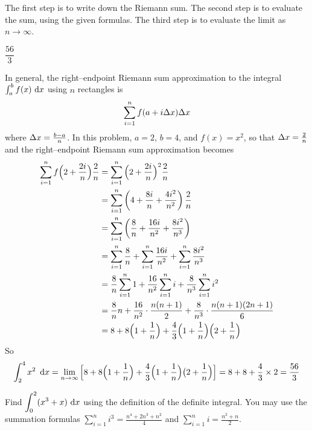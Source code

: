 \begin{hint}
The first step is to write down the Riemann sum.
The second step is to evaluate the sum, using the given formulas.
The third step is to evaluate the limit as $n\rightarrow\infty$.
\end{hint}

\begin{answer}
$\dfrac{56}{3}$
\end{answer}

\begin{solution}
In general, the right--endpoint Riemann sum
approximation to the integral $\int_a^b f(x)\,\,\mathrm{d}x$ using $n$ rectangles is
\begin{align*}
\sum_{i=1}^n f(a+i\Delta x) \Delta x
\end{align*}
where $\Delta x=\frac{b-a}{n}$. In this problem, $a=2$, $b=4$, and $f(x)=x^2$,
so that $\Delta x=\frac{2}{n}$ and the  right--endpoint Riemann
sum approximation becomes
\begin{align*}
\sum_{i=1}^n f\Big(2+\frac{2i}{n}\Big) \frac{2}{n}&=
\sum_{i=1}^n \Big(2+\frac{2i}{n}\Big)^2 \frac{2}{n}\\
&=\sum_{i=1}^n \left(4+\frac{8i}{n}+\frac{4i^2}{n^2}\right)\frac{2}{n}
\\&=\sum_{i=1}^n \left(\frac{8}{n}+\frac{16i}{n^2}+\frac{8i^2}{n^3}\right)
\\&=\sum_{i=1}^n \frac{8}{n}+\sum_{i=1}^n \frac{16i}{n^2}
  +\sum_{i=1}^n \frac{8i^2}{n^3} \cr
&=\frac{8}{n}\sum_{i=1}^n 1+\frac{16}{n^2}\sum_{i=1}^n i
  +\frac{8}{n^3}\sum_{i=1}^n i^2\cr
&=\frac{8}{n}n + \frac{16}{n^2}\cdot\frac{n(n+1)}{2}
  +\frac{8}{n^3}\cdot\frac{n(n + 1)(2n + 1)}{6} \cr
&=8 + 8\Big(1+\frac{1}{n}\Big)
  +\frac{4}{3}\Big(1+\frac{1}{n}\Big)\Big(2+\frac{1}{n}\Big) \cr
\end{align*}
So
\begin{align*}
\int_2^4 x^2\ \,\mathrm{d}x=\lim_{n\rightarrow\infty}
                      \Big[8 + 8\Big(1+\frac{1}{n}\Big)
                            +\frac{4}{3}\Big(1+\frac{1}{n}\Big)
                             \big(2+\frac{1}{n}\Big)\Big]
=8+8+\frac{4}{3}\times 2
=\frac{56}{3}
\end{align*}
\end{solution}

\begin{question}[2016Q1]
Find $\displaystyle\int_0^2 (x^3+x)\,\,\mathrm{d}x$ using the definition of the definite integral.
You may use the summation formulas $\sum\limits_{i=1}^{n}i^3 = \frac{n^4+2n^3+n^2}4$ and
$\sum\limits_{i=1}^{n} i = \frac{n^2+n}{2}$.
\end{question}

